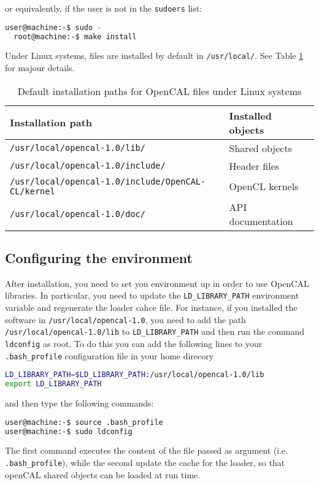 \noindent or equivalently, if the user is not in the \texttt{sudoers} list:

\begin{lstlisting}[numbers=none,language=bash,label={ch:quickstart:install}]
  user@machine:-$ sudo -
  root@machine:-$ make install
\end{lstlisting}


\noindent Under Linux systems, files are installed by default in
\texttt{/usr/local/}. See Table \ref{ch:ddefault_paths} for majour
details.

\begin{table}[h]
  \centering
  \caption{Default installation paths for OpenCAL files under Linux systems}
  \label{ch:ddefault_paths}
  \begin{tabularx}{\textwidth}{ll}
    \hline
    \textbf{Installation path} & \textbf{Installed objects}\\
    \hline
    \verb'/usr/local/opencal-1.0/lib/'                   & Shared objects \\
    \verb'/usr/local/opencal-1.0/include/'                & Header files \\
    \verb'/usr/local/opencal-1.0/include/OpenCAL-CL/kernel' & OpenCL kernels \\
    \verb'/usr/local/opencal-1.0/doc/'                   & API documentation \\
    \hline
  \end{tabularx}
\end{table}


\subsection{Configuring the environment}
After installation, you need to set you environment up in order to use
OpenCAL libraries. In particular, you need to update the
\verb'LD_LIBRARY_PATH' environment variable and regenerate the loader
cahce file. For instance, if you installed the software in
\verb'/usr/local/opencal-1.0', you need to add the path
\verb'/usr/local/opencal-1.0/lib' to \verb'LD_LIBRARY_PATH' and then
run the command \verb'ldconfig' as root. To do this you can add the
following lines to your \verb'.bash_profile' configuration file in
your home direcory
\begin{lstlisting}[numbers=none,language=bash,label={ch:quickstart:.bash_profile}]
LD_LIBRARY_PATH=$LD_LIBRARY_PATH:/usr/local/opencal-1.0/lib
export LD_LIBRARY_PATH
\end{lstlisting}
and then type the following commands:
\begin{lstlisting}[numbers=none,language=bash,label={ch:quickstart:source}]
user@machine:-$ source .bash_profile
user@machine:-$ sudo ldconfig
\end{lstlisting}
The first command executes the content of the file passed as argument
(i.e. \verb'.bash_profile'), while the second update the cache for the
loader, so that openCAL shared objects can be loaded at run time.

